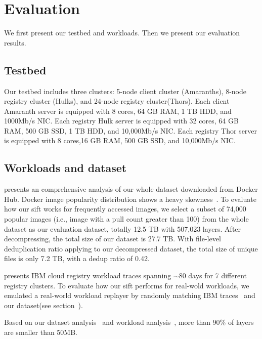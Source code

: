 \section{ Evaluation}
\label{sec:Evaluation}


We first present our testbed and workloads.
Then we present our evaluation results.
\subsection{Testbed}

Our testbed includes three clusters: 
5-node client cluster (Amaranths),
8-node registry cluster (Hulks), and
24-node registry cluster(Thors).
Each client Amaranth server is equipped with 8 cores, 64 GB RAM, 1 TB HDD, and 1000Mb/s NIC.
Each registry Hulk server is equipped with 32 cores, 64 GB RAM, 500 GB SSD, 1 TB HDD, and 10,000Mb/s NIC. 
Each registry Thor server is equipped with 8 cores,16 GB RAM, 500 GB SSD, and 10,000Mb/s NIC. 
\subsection{Workloads and dataset}
\cite{xxx} presents an comprehensive analysis of our whole dataset downloaded from Docker Hub. 
Docker image popularity distribution shows a heavy skewness~\cite{xxx}.
To evaluate how our sift works for frequently accessed images,
we select a subset of 74,000 popular images (i.e., image with a pull count greater than 100) from the whole dataset 
as our evaluation dataset, 
totally 12.5 TB with 507,023 layers.
After decompressing,  the total size of our dataset is 27.7 TB.
With file-level deduplication ratio applying to our decompressed dataset, 
the total size of unique files is only 7.2 TB, with a dedup ratio of 0.42.

\cite{xxx} presents IBM cloud registry workload traces spanning $\sim$80 days for 7 different registry clusters. 
To evaluate how our sift performs for real-wold workloads,
we emulated a real-world workload replayer by randomly matching IBM traces~\cite{xxx} and our dataset(see section~\cite{xxx}). 

Based on our dataset analysis~\cite{xxx} and workload analysis~\cite{xxx},
more than 90\% of layers are smaller than 50MB.


